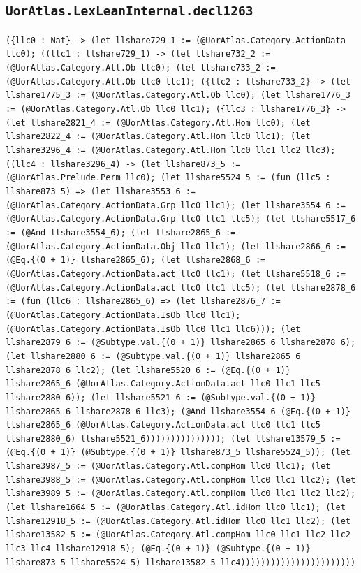 \documentclass[11pt]{article}
\begin{document}
\subsection*{\texttt{UorAtlas.LexLeanInternal.decl1263}}
\noindent\texttt{(\{llc0 : Nat\} -> (let llshare729\_1 := (@UorAtlas.Category.ActionData llc0); ((llc1 : llshare729\_1) -> (let llshare732\_2 := (@UorAtlas.Category.Atl.Ob llc0); (let llshare733\_2 := (@UorAtlas.Category.Atl.Ob llc0 llc1); (\{llc2 : llshare733\_2\} -> (let llshare1775\_3 := (@UorAtlas.Category.Atl.Ob llc0); (let llshare1776\_3 := (@UorAtlas.Category.Atl.Ob llc0 llc1); (\{llc3 : llshare1776\_3\} -> (let llshare2821\_4 := (@UorAtlas.Category.Atl.Hom llc0); (let llshare2822\_4 := (@UorAtlas.Category.Atl.Hom llc0 llc1); (let llshare3296\_4 := (@UorAtlas.Category.Atl.Hom llc0 llc1 llc2 llc3); ((llc4 : llshare3296\_4) -> (let llshare873\_5 := (@UorAtlas.Prelude.Perm llc0); (let llshare5524\_5 := (fun (llc5 : llshare873\_5) => (let llshare3553\_6 := (@UorAtlas.Category.ActionData.Grp llc0 llc1); (let llshare3554\_6 := (@UorAtlas.Category.ActionData.Grp llc0 llc1 llc5); (let llshare5517\_6 := (@And llshare3554\_6); (let llshare2865\_6 := (@UorAtlas.Category.ActionData.Obj llc0 llc1); (let llshare2866\_6 := (@Eq.\{(0 + 1)\} llshare2865\_6); (let llshare2868\_6 := (@UorAtlas.Category.ActionData.act llc0 llc1); (let llshare5518\_6 := (@UorAtlas.Category.ActionData.act llc0 llc1 llc5); (let llshare2878\_6 := (fun (llc6 : llshare2865\_6) => (let llshare2876\_7 := (@UorAtlas.Category.ActionData.IsOb llc0 llc1); (@UorAtlas.Category.ActionData.IsOb llc0 llc1 llc6))); (let llshare2879\_6 := (@Subtype.val.\{(0 + 1)\} llshare2865\_6 llshare2878\_6); (let llshare2880\_6 := (@Subtype.val.\{(0 + 1)\} llshare2865\_6 llshare2878\_6 llc2); (let llshare5520\_6 := (@Eq.\{(0 + 1)\} llshare2865\_6 (@UorAtlas.Category.ActionData.act llc0 llc1 llc5 llshare2880\_6)); (let llshare5521\_6 := (@Subtype.val.\{(0 + 1)\} llshare2865\_6 llshare2878\_6 llc3); (@And llshare3554\_6 (@Eq.\{(0 + 1)\} llshare2865\_6 (@UorAtlas.Category.ActionData.act llc0 llc1 llc5 llshare2880\_6) llshare5521\_6))))))))))))))); (let llshare13579\_5 := (@Eq.\{(0 + 1)\} (@Subtype.\{(0 + 1)\} llshare873\_5 llshare5524\_5)); (let llshare3987\_5 := (@UorAtlas.Category.Atl.compHom llc0 llc1); (let llshare3988\_5 := (@UorAtlas.Category.Atl.compHom llc0 llc1 llc2); (let llshare3989\_5 := (@UorAtlas.Category.Atl.compHom llc0 llc1 llc2 llc2); (let llshare1664\_5 := (@UorAtlas.Category.Atl.idHom llc0 llc1); (let llshare12918\_5 := (@UorAtlas.Category.Atl.idHom llc0 llc1 llc2); (let llshare13582\_5 := (@UorAtlas.Category.Atl.compHom llc0 llc1 llc2 llc2 llc3 llc4 llshare12918\_5); (@Eq.\{(0 + 1)\} (@Subtype.\{(0 + 1)\} llshare873\_5 llshare5524\_5) llshare13582\_5 llc4)))))))))))))))))))))))}\par
\end{document}
